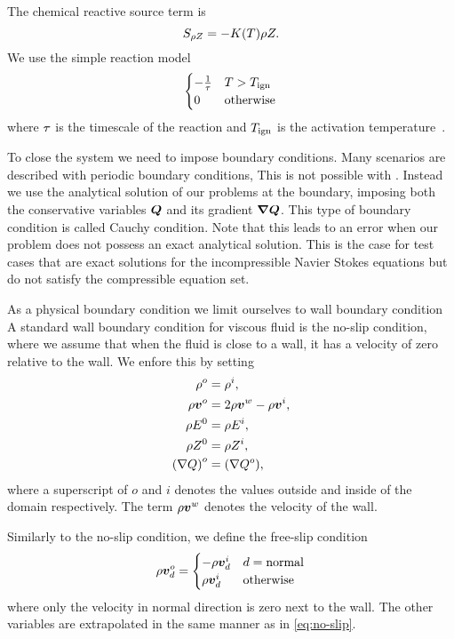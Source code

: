 The chemical reactive source term is
\begin{equation}\label{eq:source-reaction}
  \source[\QZ] = - K(T) \QZ.
\end{equation}
We use the simple reaction model
\begin{equation}\label{eq:reaction-model}
\begin{cases}
  - \frac{1}{\tau} & T > T_{\text{ign}}\\
  0 & \text{otherwise}
\end{cases}  
\end{equation}
where $\tau$ is the timescale of the reaction and $T_{\text{ign}}$ is the activation temperature~\cite{hidalgo2011ader,helzel2000modified}.

To close the system we need to impose boundary conditions.
Many scenarios are described with periodic boundary conditions,
This is not possible with \exahype{}.
Instead we use the analytical solution of our problems at the boundary, imposing both the conservative variables $\bm{Q}$ and its gradient $\gradQ$.
This type of boundary condition is called Cauchy condition.
Note that this leads to an error when our problem does not possess an exact analytical solution.
This is the case for test cases that are exact solutions for the incompressible Navier Stokes equations but do not satisfy the compressible equation set.

As a physical boundary condition we limit ourselves to wall boundary condition
A standard wall boundary condition for viscous fluid is the no-slip condition, where we assume that when the fluid is close to a wall, it has a velocity of zero relative to the wall.
We enfore this by setting
\begin{align}
  \label{eq:no-slip}
  \begin{split}
  \rho^o &= \rho^i, \\
  \rho \bm{v}^o &= 2 \rho \bm{v}^w - \rho \bm{v}^i, \\
  \rho E^0 &= \rho E^i,\\
  \rho Z^0 &= \rho Z^i,\\
  {(\nabla Q)}^o &= {(\nabla Q^o)},
  \end{split}
\end{align}
where a superscript of $o$ and $i$ denotes the values outside and inside of the domain respectively.
The term $\rho \bm{v}^w$ denotes the velocity of the wall.

Similarly to the no-slip condition, we define the free-slip condition
\begin{equation}
  \label{eq:free-slip}
  \rho \bm{v}^o_d = \begin{cases}
    -\rho \bm{v}^i_d & d = \text{normal} \\
    \rho \bm{v}^i_d & \text{otherwise}
    \end{cases}
\end{equation}
where only the velocity in normal direction is zero next to the wall.
The other variables are extrapolated in the same manner as in \cref{eq:no-slip}.

